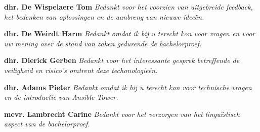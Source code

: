 \begin{center}
	
	
		\large{\textbf{dhr. De Wispelaere Tom}}\newline
	\textit{Bedankt voor het voorzien van uitgebreide feedback, het bedenken van oplossingen en de aanbreng van nieuwe idee\"en.}\newline
	
			\large{\textbf{dhr. De Weirdt Harm}}\newline
	\textit{Bedankt omdat ik bij u terecht kon voor vragen en voor uw mening over de stand van zaken gedurende de bachelorproef.}\newline
	
		\large{\textbf{dhr. Dierick Gerben}}\newline
	\textit{Bedankt voor het interessante gesprek betreffende de veiligheid en risico's omtrent deze techonologie\"en.}\newline
	
		\large{\textbf{dhr. Adams Pieter}}\newline
	\textit{Bedankt omdat ik bij u terecht kon voor technische vragen en de introductie van Ansible Tower.}\newline
	
	\large{\textbf{mevr. Lambrecht Carine}}\newline
\textit{Bedankt voor het verzorgen van het lingu\"istisch aspect van de bachelorproef.}\newline

\end{center}